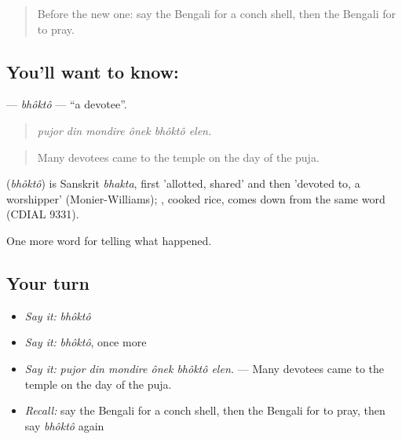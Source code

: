 \begin{quote}
Before the new one: say the Bengali for a conch shell, then the Bengali for to pray.
\end{quote}

\subsection*{You'll want to know: }
\textbf{} — \emph{bhôktô} — \textquotedblleft{}a devotee\textquotedblright{}.

\begin{quote}
     
\end{quote}

\begin{quote}
\emph{pujor din mondire ônek bhôktô elen.}
\end{quote}

\begin{quote}
Many devotees came to the temple on the day of the puja.
\end{quote}

\begin{cousinweb}
\textbf{} (\emph{bhôktô}) is Sanskrit \emph{bhakta}, first 'allotted, shared' and then 'devoted to, a worshipper' (Monier-Williams); \textbf{}, cooked rice, comes down from the same word (CDIAL 9331).
\end{cousinweb}

\begin{grammarlens}[title={What you've built}]
One more word for telling what happened.
\end{grammarlens}

\subsection*{Your turn}
\begin{itemize}
\raggedright
  \item \emph{Say it:} \emph{bhôktô}
  \item \emph{Say it:} \emph{bhôktô}, once more
  \item \emph{Say it:} \emph{pujor din mondire ônek bhôktô elen.} — Many devotees came to the temple on the day of the puja.
  \item \emph{Recall:} say the Bengali for a conch shell, then the Bengali for to pray, then say \emph{bhôktô} again
\end{itemize}

